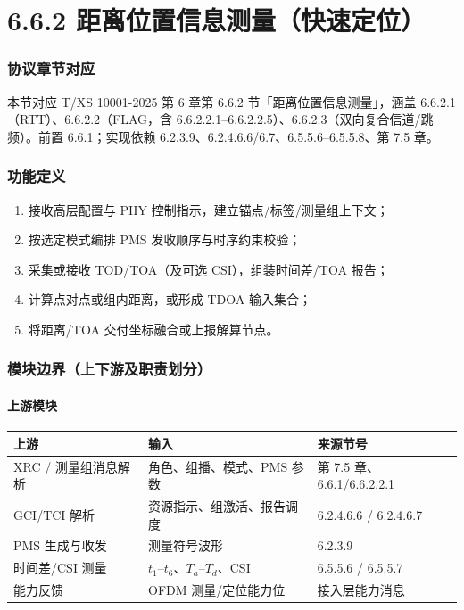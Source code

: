 \documentclass[11pt,a4paper]{ctexart}
\begin{document}
\newpage
\part{6.6.2 距离位置信息测量（快速定位）}

\section{协议章节对应}

本节对应 T/XS 10001-2025 第 6 章第 6.6.2 节「距离位置信息测量」，涵盖 6.6.2.1（RTT）、6.6.2.2（FLAG，含 6.6.2.2.1--6.6.2.2.5）、6.6.2.3（双向复合信道/跳频）。前置 6.6.1；实现依赖 6.2.3.9、6.2.4.6.6/6.7、6.5.5.6--6.5.5.8、第 7.5 章。

\section{功能定义}

\begin{enumerate}[nosep]
  \item 接收高层配置与 PHY 控制指示，建立锚点/标签/测量组上下文；
  \item 按选定模式编排 PMS 发收顺序与时序约束校验；
  \item 采集或接收 TOD/TOA（及可选 CSI），组装时间差/TOA 报告；
  \item 计算点对点或组内距离，或形成 TDOA 输入集合；
  \item 将距离/TOA 交付坐标融合或上报解算节点。
\end{enumerate}

\section{模块边界（上下游及职责划分）}

\subsection{上游模块}

\begin{table}[h]
\centering
\small
\begin{tabular}{L{3.8cm}L{4.2cm}L{5cm}}
\toprule
\textbf{上游} & \textbf{输入} & \textbf{来源节号} \\
\midrule
XRC / 测量组消息解析 & 角色、组播、模式、PMS 参数 & 第 7.5 章、6.6.1/6.6.2.2.1 \\
GCI/TCI 解析 & 资源指示、组激活、报告调度 & 6.2.4.6.6 / 6.2.4.6.7 \\
PMS 生成与收发 & 测量符号波形 & 6.2.3.9 \\
时间差/CSI 测量 & $t_1$--$t_6$、$T_a$--$T_d$、CSI & 6.5.5.6 / 6.5.5.7 \\
能力反馈 & OFDM 测量/定位能力位 & 接入层能力消息 \\
\bottomrule
\end{tabular}
\end{table}
\end{document}
